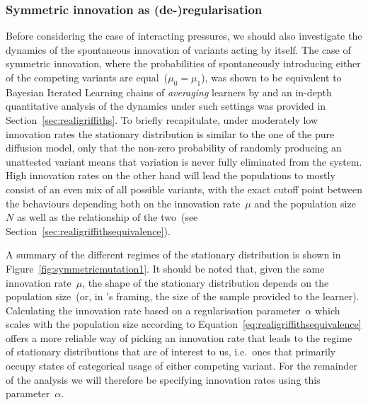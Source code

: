 \subsubsection{Symmetric innovation as (de-)regularisation}

Before considering the case of interacting pressures, we should also investigate the dynamics of the spontaneous innovation of variants acting by itself. The case of symmetric innovation, where the probabilities of spontaneously introducing either of the competing variants are equal~($\mu_0=\mu_1$), was shown to be equivalent to Bayesian Iterated Learning chains of \emph{averaging} learners by \citeauthor{Reali2010} and an in-depth quantitative analysis of the dynamics under such settings was provided in Section~\ref{sec:realigriffiths}. To briefly recapitulate, under moderately low innovation rates the stationary distribution is similar to the one of the pure diffusion model, only that the non-zero probability of randomly producing an unattested variant means that variation is never fully eliminated from the system. High innovation rates on the other hand will lead the populations to mostly consist of an even mix of all possible variants, with the exact cutoff point between the behaviours depending both on the innovation rate~$\mu$ and the population size~$N$ as well as the relationship of the two~(see Section~\ref{sec:realigriffithsequivalence}).

A summary of the different regimes of the stationary distribution is shown in Figure~\ref{fig:symmetricmutation1}. It should be noted that, given the same innovation rate~$\mu$, the shape of the stationary distribution depends on the population size~(or, in \citeauthor{Reali2009}'s framing, the size of the sample provided to the learner). Calculating the innovation rate based on a regularisation parameter~$\alpha$ which scales with the population size according to Equation~\ref{eq:realigriffithsequivalence} offers a more reliable way of picking an innovation rate that leads to the regime of stationary distributions that are of interest to us, i.e.~ones that primarily occupy states of categorical usage of either competing variant. For the remainder of the analysis we will therefore be specifying innovation rates using this parameter~$\alpha$.

